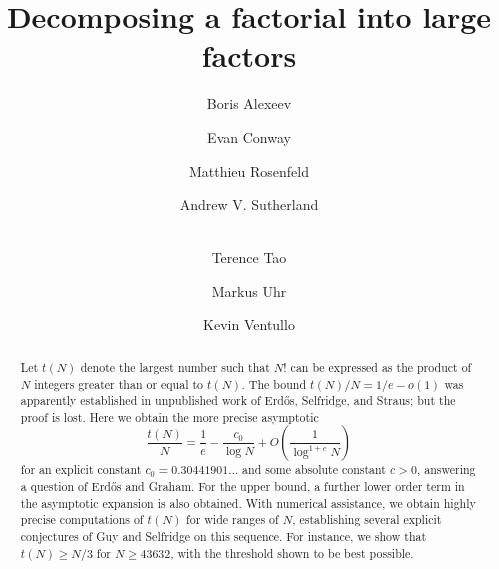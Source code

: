 \documentclass[10pt,a4paper,reqno]{amsart}
\numberwithin{equation}{section}
\theoremstyle{plain}
\theoremstyle{definition}
\begin{document}
\title{Decomposing a factorial into large factors}

\author[Alexeev]{Boris Alexeev}
\address{Unaffiliated, Athens, GA 30605.}

\author[Conway]{Evan Conway}
\address{UVA Department of Mathematics, Charlottesville, VA 22903.}

\author[Rosenfeld]{Matthieu Rosenfeld}
\address{LIRMM, Univ Montpellier, CNRS, Montpellier, France.}

\author[Sutherland]{Andrew V. Sutherland}
\address{MIT Department of Mathematics, Cambridge, MA 02139.}

\author[Tao]{\\Terence Tao}
\address{UCLA Department of Mathematics, Los Angeles, CA 90095-1555.}

\author[Uhr]{Markus Uhr}
\address{Unaffiliated, Zurich, Switzerland.}

\author[Ventullo]{Kevin Ventullo}
\address{Google, Mountain View, CA.}



\begin{abstract}  Let $t(N)$ denote the largest number such that $N!$ can be expressed as the product of $N$ integers greater than or equal to $t(N)$.
The bound $t(N)/N = 1/e-o(1)$ was apparently established in unpublished work of Erd\H{o}s, Selfridge, and Straus; but the proof is lost.  Here we obtain the more precise asymptotic 
$$ \frac{t(N)}{N} = \frac{1}{e} - \frac{c_0}{\log N} + O\left( \frac{1}{\log^{1+c} N} \right)$$
for an explicit constant $c_0 = 0.30441901\dots$ and some absolute constant $c>0$, answering a question of Erd\H{o}s and Graham.  For the upper bound, a further lower order term in the asymptotic expansion is also obtained.  With numerical assistance, we obtain highly precise computations of $t(N)$ for wide ranges of $N$, establishing several explicit conjectures of Guy and Selfridge on this sequence.  For instance, we show that $t(N) \geq N/3$ for $N \geq 43632$, with the threshold shown to be best possible. 
\end{abstract}


\maketitle
\end{document}
